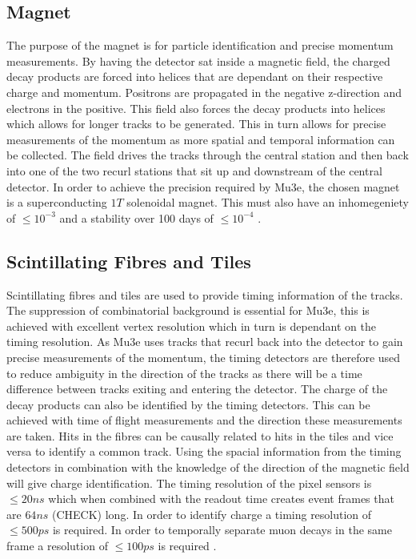 \subsection*{Magnet}
The purpose of the magnet is for particle identification and precise momentum measurements. By having the detector sat inside a magnetic field, the charged decay products are forced into helices that are dependant on their respective charge and momentum. Positrons are propagated in the negative z-direction and electrons in the positive. This field also forces the decay products into helices which allows for longer tracks to be generated. This in turn allows for precise measurements of the momentum as more spatial and temporal information can be collected. The field drives the tracks through the central station and then back into one of the two recurl stations that sit up and downstream of the central detector. In order to achieve the precision required by Mu3e, the chosen magnet is a superconducting $1T$ solenoidal magnet. This must also have an inhomegeniety of $\leq 10^{-3}$ and a stability over 100 days of $\leq 10^{-4}$ \cite{Arndt}.

\subsection*{Scintillating Fibres and Tiles}
Scintillating fibres and tiles are used to provide timing information of the tracks. The suppression of combinatorial background is essential for Mu3e, this is achieved with excellent vertex resolution which in turn is dependant on the timing resolution. As Mu3e uses tracks that recurl back into the detector to gain precise measurements of the momentum, the timing detectors are therefore used to reduce ambiguity in the direction of the tracks as there will be a time difference between tracks exiting and entering the detector. The charge of the decay products can also be identified by the timing detectors. This can be achieved with time of flight measurements and the direction these measurements are taken. Hits in the fibres can be causally related to hits in the tiles and vice versa to identify a common track. Using the spacial information from the timing detectors in combination with the knowledge of the direction of the magnetic field will give charge identification. The timing resolution of the pixel sensors is $\leq 20 ns$ which when combined with the readout time creates event frames that are $64 ns$ (CHECK) long. In order to identify charge a timing resolution of $\leq 500 ps$ is required. In order to temporally separate muon decays in the same frame a resolution of $\leq 100 ps$ is required \cite{Arndt}.

